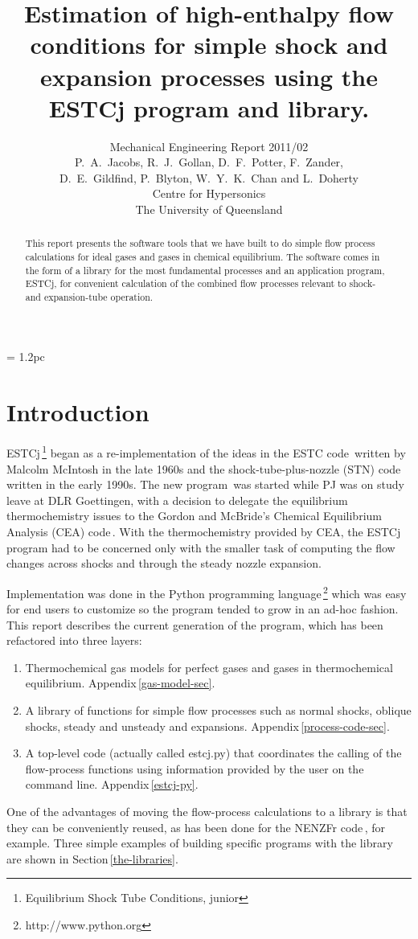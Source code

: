 \documentclass[landscape,12pt,a4paper]{article}
\title{
  Estimation of high-enthalpy flow conditions
  for simple shock and expansion processes using
  the ESTCj program and library.
}
\author{
  Mechanical Engineering Report 2011/02 \\
  P.~A.~Jacobs, R.~J.~Gollan, D.~F.~Potter, F.~Zander,\\
  D.~E.~Gildfind, P.~Blyton, W.~Y.~K.~Chan and L.~Doherty \\
  Centre for Hypersonics\\
  The University of Queensland
}
\begin{document}
\maketitle

\baselineskip = 1.2pc

\begin{abstract}
This report presents the software tools that we have built to do simple
flow process calculations for ideal gases and gases in chemical equilibrium.
The software comes in the form of a library for the most fundamental processes and
an application program, ESTCj, for convenient calculation of 
the combined flow processes relevant to shock- and expansion-tube operation.
\end{abstract}

\newpage
\tableofcontents


\newpage
\section{Introduction}
%
ESTCj\,\footnote{Equilibrium Shock Tube Conditions, junior} 
began as a re-implementation of the ideas in the ESTC code\,\cite{mcintosh_70}
written by Malcolm McIntosh in the late 1960s and 
the shock-tube-plus-nozzle (STN) code\,\cite{krek_jacobs_93} written in the early 1990s.
The new program\,\cite{jacobs_gardner_2003a} was started 
while PJ was on study leave at DLR Goettingen,
with a decision to delegate the equilibrium thermochemistry issues to the 
Gordon and McBride's Chemical Equilibrium Analysis (CEA) 
code\,\cite{gordon_mcbride_1994,mcbride_gordon_1996}.
With the thermochemistry provided by CEA, the ESTCj program had to be concerned
only with the smaller task of computing the flow changes across shocks and through
the steady nozzle expansion.

\medskip
Implementation was done in the Python programming language\,\footnote{http://www.python.org}
which was easy for end users to customize so the program tended to grow in an ad-hoc fashion.
This report describes the current generation of the program, which has been refactored into
three layers:
\begin{enumerate}
 \item Thermochemical gas models for perfect gases and gases in thermochemical equilibrium.
  Appendix\,\ref{gas-model-sec}.
 \item A library of functions for simple flow processes such as normal shocks, oblique shocks,
  steady and unsteady and expansions. Appendix\,\ref{process-code-sec}.
 \item A top-level code (actually called estcj.py) that coordinates the calling 
  of the flow-process functions using information provided by the user on the command line.
  Appendix\,\ref{estcj-py}.
\end{enumerate}
One of the advantages of moving the flow-process calculations to a library is that 
they can be conveniently reused, 
as has been done for the NENZFr code\,\cite{doherty_etal_2012a}, for example.
Three simple examples of building specific programs with the library are shown in
Section\,\ref{the-libraries}.
\end{document}
